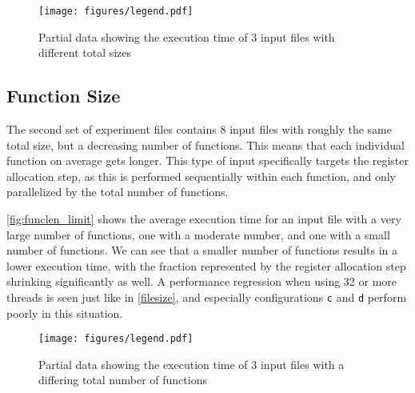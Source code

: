 \documentclass[11pt,dvipsnames]{article}
\newcommand{\mono}[1]{\texttt{#1}}
\begin{document}
\begin{figure}[!ht]
    \centering
    \texttt{[image: figures/legend.pdf]}
    \caption{Partial data showing the execution time of 3 input files with different total sizes}
    \label{fig:basic_limit}
\end{figure}

\subsection{Function Size}
The second set of experiment files contains 8 input files with roughly the same total size, but a decreasing number of functions. This means that each individual function on average gets longer. This type of input specifically targets the register allocation step, as this is performed sequentially within each function, and only parallelized by the total number of functions.

\autoref{fig:funclen_limit} shows the average execution time for an input file with a very large number of functions, one with a moderate number, and one with a small number of functions. We can see that a smaller number of functions results in a lower execution time, with the fraction represented by the register allocation step shrinking significantly as well. A performance regression when using 32 or more threads is seen just like in \autoref{filesize}, and especially configurations \mono{c} and \mono{d} perform poorly in this situation.

\begin{figure}[!ht]
    \centering
    \texttt{[image: figures/legend.pdf]}
    \caption{Partial data showing the execution time of 3 input files with a differing total number of functions}
    \label{fig:funclen_limit}
\end{figure}
\end{document}
